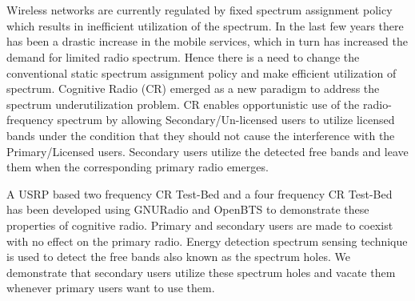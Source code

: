 \chapter*{}
Wireless networks are currently regulated by fixed spectrum assignment policy
which results in inefficient utilization of the spectrum. In the last few
years there has been a drastic increase in the mobile services, which in turn
has increased the demand for limited radio spectrum. Hence there is a need to
change the conventional static spectrum assignment policy and make efficient
utilization of spectrum. Cognitive Radio (CR) emerged as a new paradigm to
address the spectrum underutilization problem.  CR enables opportunistic use
of the radio-frequency spectrum by allowing Secondary/Un-licensed users to
utilize licensed bands under the condition that they should not cause the
interference with the Primary/Licensed users. Secondary users utilize the
detected free bands and leave them when the corresponding primary radio
emerges.

A USRP based two frequency CR Test-Bed and a four frequency CR Test-Bed has been
developed using GNURadio and OpenBTS to demonstrate these properties of
cognitive radio. Primary and secondary users are made to coexist with no
effect on the primary radio. Energy detection spectrum sensing technique is
used to detect the free bands also known as the spectrum holes. We demonstrate
that secondary users utilize these spectrum holes and vacate them whenever
primary users want to use them.
